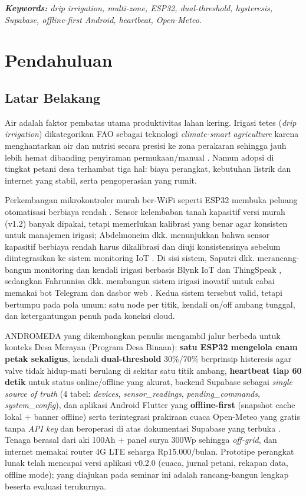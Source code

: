 \documentclass[12pt,a4paper,oneside]{report}
\begin{document}
\textit{\textbf{Keywords:} drip irrigation, multi-zone, ESP32, dual-threshold, hysteresis, Supabase, offline-first Android, heartbeat, Open-Meteo.}

\chapter{Pendahuluan}

\section{Latar Belakang}
Air adalah faktor pembatas utama produktivitas lahan kering. Irigasi tetes (\textit{drip irrigation}) dikategorikan FAO sebagai teknologi \textit{climate-smart agriculture} karena menghantarkan air dan nutrisi secara presisi ke zona perakaran sehingga jauh lebih hemat dibanding penyiraman permukaan/manual \cite{fao-drip}. Namun adopsi di tingkat petani desa terhambat tiga hal: biaya perangkat, kebutuhan listrik dan internet yang stabil, serta pengoperasian yang rumit.

Perkembangan mikrokontroler murah ber-WiFi seperti ESP32 membuka peluang otomatisasi berbiaya rendah \cite{espressif-datasheet}. Sensor kelembaban tanah kapasitif versi murah (v1.2) banyak dipakai, tetapi memerlukan kalibrasi yang benar agar konsisten untuk manajemen irigasi; Abdelmoneim dkk. menunjukkan bahwa sensor kapasitif berbiaya rendah harus dikalibrasi dan diuji konsistensinya sebelum diintegrasikan ke sistem monitoring IoT \cite{abdelmoneim2025}. Di sisi sistem, Saputri dkk. merancang-bangun monitoring dan kendali irigasi berbasis Blynk IoT dan ThingSpeak \cite{saputri2025}, sedangkan Fahrunnisa dkk. membangun sistem irigasi inovatif untuk cabai memakai bot Telegram dan dasbor web \cite{fahrunnisa2026}. Kedua sistem tersebut valid, tetapi bertumpu pada pola umum: satu node per titik, kendali on/off ambang tunggal, dan ketergantungan penuh pada koneksi cloud.

ANDROMEDA yang dikembangkan penulis mengambil jalur berbeda untuk konteks Desa Merayan (Program Desa Binaan): \textbf{satu ESP32 mengelola enam petak sekaligus}, kendali \textbf{dual-threshold} 30\%/70\% berprinsip histeresis agar valve tidak hidup-mati berulang di sekitar satu titik ambang, \textbf{heartbeat tiap 60 detik} untuk status online/offline yang akurat, backend Supabase sebagai \textit{single source of truth} (4 tabel: \textit{devices}, \textit{sensor\_readings}, \textit{pending\_commands}, \textit{system\_config}), dan aplikasi Android Flutter yang \textbf{offline-first} (snapshot cache lokal + banner offline) serta terintegrasi prakiraan cuaca Open-Meteo yang gratis tanpa \textit{API key} \cite{openmeteo-docs} dan beroperasi di atas dokumentasi Supabase yang terbuka \cite{supabase-docs}. Tenaga berasal dari aki 100Ah + panel surya 300Wp sehingga \textit{off-grid}, dan internet memakai router 4G LTE seharga Rp15.000/bulan. Prototipe perangkat lunak telah mencapai versi aplikasi v0.2.0 (cuaca, jurnal petani, rekapan data, offline mode); yang diajukan pada seminar ini adalah rancang-bangun lengkap beserta evaluasi terukurnya.
\end{document}
